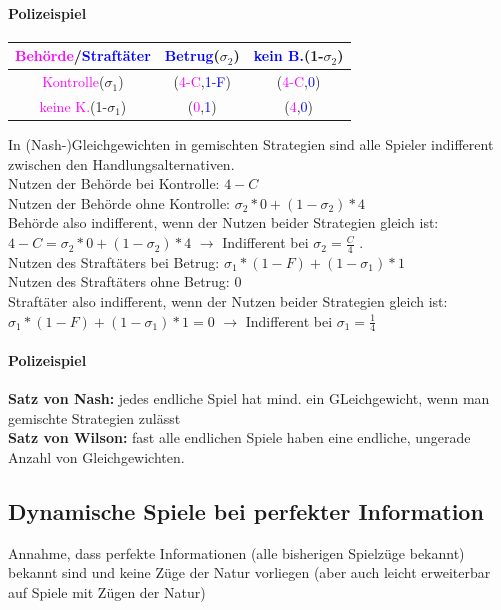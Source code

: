\documentclass[11pt]{article}
\begin{document}
\paragraph{Polizeispiel}
\begin{center}
\begin{tabular}{c|c|c}
\textcolor{magenta}{Behörde}/\textcolor{blue}{Straftäter} & \textcolor{blue}{Betrug}(\(\sigma_{\text{2}}\)) & \textcolor{blue}{kein B.}(1-\(\sigma_{\text{2}}\))\\
\hline
\textcolor{magenta}{Kontrolle}(\(\sigma_{\text{1}}\)) & (\textcolor{magenta}{4-C},\textcolor{blue}{1-F}) & (\textcolor{magenta}{4-C},\textcolor{blue}{0})\\
\textcolor{magenta}{keine K.}(1-\(\sigma_{\text{1}}\)) & (\textcolor{magenta}{0},\textcolor{blue}{1}) & (\textcolor{magenta}{4},\textcolor{blue}{0})\\
\end{tabular}
\end{center}
In (Nash-)Gleichgewichten in gemischten Strategien sind alle Spieler indifferent zwischen den Handlungsalternativen.\\
Nutzen der Behörde bei Kontrolle: \(4-C\) \\
Nutzen der Behörde ohne Kontrolle: \(\sigma_2 * 0 + (1- \sigma_2)*4\) \\
Behörde also indifferent, wenn der Nutzen beider Strategien gleich ist:\\
\(4-C=\sigma_2 * 0 + (1- \sigma_2)*4\) \(\rightarrow\) Indifferent bei \(\sigma_2 = \frac{C}{4}\) .\\
\newline
Nutzen des Straftäters bei Betrug: \(\sigma_1 * (1-F) + (1-\sigma_1) * 1\) \\
Nutzen des Straftäters ohne Betrug: \(0\) \\
Straftäter also indifferent, wenn der Nutzen beider Strategien gleich ist:\\
\(\sigma_1 * (1-F) + (1-\sigma_1) * 1 = 0\) \(\rightarrow\) Indifferent bei \(\sigma_1 = \frac{1}{4}\)

\paragraph{Polizeispiel}
\textbf{Satz von Nash:} jedes endliche Spiel hat mind. ein GLeichgewicht, wenn man gemischte Strategien zulässt\\
\textbf{Satz von Wilson:} fast alle endlichen Spiele haben eine endliche, ungerade Anzahl von Gleichgewichten.
\subsection{Dynamische Spiele bei perfekter Information}
\label{sec:org5e91f6f}
Annahme, dass perfekte Informationen (alle bisherigen Spielzüge bekannt) bekannt sind und keine Züge der Natur vorliegen (aber auch leicht erweiterbar auf Spiele mit Zügen der Natur)
\end{document}
